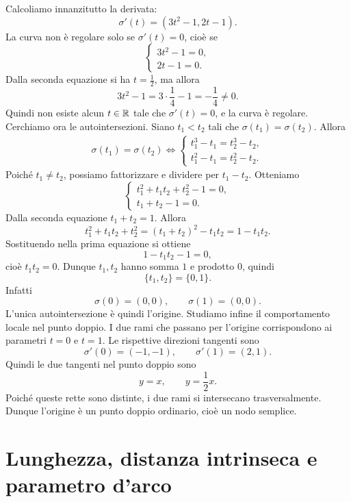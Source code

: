 \documentclass[a4paper]{article}
\begin{document}
\begin{snippetsolution}{}
    Calcoliamo innanzitutto la derivata:
    \[
        \sigma'(t)=\left(3t^2-1,2t-1\right).
    \]
    La curva non è regolare solo se \(\sigma'(t)=0\), cioè se
    \[
        \begin{cases}
            3t^2-1=0,\\
            2t-1=0.
        \end{cases}
    \]
    Dalla seconda equazione si ha \(t=\frac12\), ma allora
    \[
        3t^2-1=3\cdot\frac14-1=-\frac14\neq 0.
    \]
    Quindi non esiste alcun \(t\in\mathbb{R}\) tale che \(\sigma'(t)=0\), e la curva è regolare.
    Cerchiamo ora le autointersezioni. Siano \(t_1<t_2\) tali che \(\sigma(t_1)=\sigma(t_2)\). Allora
    \begin{align*}
        \sigma(t_1)=\sigma(t_2)
        \iff
        \begin{cases}
            t_1^3-t_1=t_2^3-t_2,\\
            t_1^2-t_1=t_2^2-t_2.
        \end{cases}
    \end{align*}
    Poiché \(t_1\neq t_2\), possiamo fattorizzare e dividere per \(t_1-t_2\). Otteniamo
    \[
        \begin{cases}
            t_1^2+t_1t_2+t_2^2-1=0,\\
            t_1+t_2-1=0.
        \end{cases}
    \]
    Dalla seconda equazione \(t_1+t_2=1\). Allora
    \[
        t_1^2+t_1t_2+t_2^2=(t_1+t_2)^2-t_1t_2=1-t_1t_2.
    \]
    Sostituendo nella prima equazione si ottiene
    \[
        1-t_1t_2-1=0,
    \]
    cioè \(t_1t_2=0\). Dunque \(t_1,t_2\) hanno somma \(1\) e prodotto \(0\), quindi
    \[
        \{t_1,t_2\}=\{0,1\}.
    \]
    Infatti
    \[
        \sigma(0)=(0,0),
        \qquad
        \sigma(1)=(0,0).
    \]
    L'unica autointersezione è quindi l'origine.
    Studiamo infine il comportamento locale nel punto doppio. I due rami che passano per l'origine corrispondono ai parametri \(t=0\) e \(t=1\). Le rispettive direzioni tangenti sono
    \[
        \sigma'(0)=(-1,-1),
        \qquad
        \sigma'(1)=(2,1).
    \]
    Quindi le due tangenti nel punto doppio sono
    \[
        y=x,
        \qquad
        y=\frac12x.
    \]
    Poiché queste rette sono distinte, i due rami si intersecano trasversalmente. Dunque l'origine è un punto doppio ordinario, cioè un nodo semplice.
\end{snippetsolution}

\section{Lunghezza, distanza intrinseca e parametro d'arco}
\end{document}
